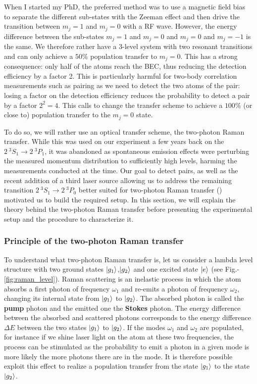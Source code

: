 When I started my PhD, the preferred method was to use a magnetic field bias to separate the different sub-states with the Zeeman effect and then drive the transition between $m_j=1$ and $m_j=0$ with a RF wave. However, the energy difference between the sub-states $m_j=1$ and $m_j=0$ and $m_j=0$ and $m_j=-1$ is the same. We therefore rather have a 3-level system with two resonant transitions and can only achieve a $50\%$ population transfer to $m_j=0$. This has a strong consequence: only half of the atoms reach the BEC, thus reducing the detection efficiency by a factor 2. This is particularly harmful for two-body correlation measurements such as \kmk pairing as we need to detect the two atoms of the pair: losing a factor on the detection efficiency reduces the probability to detect a \kmk pair by a factor $2^2=4$. This calls to change the transfer scheme to achieve a $100\%$ (or close to) population transfer to the $m_j=0$ state.

To do so, we will rather use an optical transfer scheme, the two-photon Raman transfer. While this was used on our experiment a few years back on the $2 \ ^3 S_1 \rightarrow 2 \ ^3 P_1$, it was abandoned as spontaneous emission effects were perturbing the measured momentum distribution to sufficiently high levels, harming the measurements conducted at the time. Our goal to detect \kmk pairs, as well as the recent addition of a third laser source allowing us to address the remaining transition $2 \ ^3 S_1 \rightarrow 2 \ ^3 P_0$ better suited for two-photon Raman transfer () motivated us to build the required setup. In this section, we will explain the theory behind the two-photon Raman transfer before presenting the experimental setup and the procedure to characterize it.

\subsubsection{Principle of the two-photon Raman transfer}


To understand what two-photon Raman transfer is, let us consider a lambda level structure with two ground states $\ket{g_1}$,$\ket{g_2}$ and one excited state $\ket{e}$ (see Fig.-\ref{fig:raman_level}). Raman scattering is an inelastic process in which the atom absorbs a first photon of frequency $\omega_1$ and re-emits a photon of frequency $\omega_2$, changing its internal state from $\ket{g_1}$ to $\ket{g_2}$. The absorbed photon is called the \textbf{pump} photon and the emitted one the \textbf{Stokes} photon. The energy difference between the absorbed and scattered photons corresponds to the energy difference $\Delta E$ between the two states $\ket{g_1}$ to $\ket{g_2}$. If the modes $\omega_1$ and $\omega_2$ are populated, for instance if we shine laser light on the atom at these two frequencies, the process can be stimulated as the probability to emit a photon in a given mode is more likely the more photons there are in the mode. It is therefore possible exploit this effect to realize a population transfer from the state $\ket{g_1}$ to the state $\ket{g_2}$.

